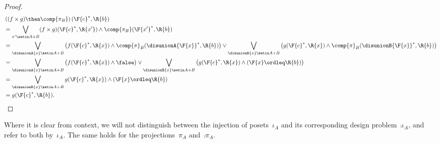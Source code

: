 \begin{proof}
\begin{equation}
\begin{aligned}
             & \left((f\times g)\then \comp{\pi_B}\right)(\F{c}^*,\R{b}) \\
             & =\bigvee_{x'\setin A+B} (f\times g)(\F{c}^*,\R{x'}) \wedge \comp{\pi_B}(\F{x'}^*,\R{b}) \\
             & =\bigvee_{\disunionA{x}\setin A+B}\left( f(\F{c}^*,\R{x}) \wedge \comp{\pi}_B(\disunionA{\F{x}}^*,\R{b})\right) \vee
            \bigvee_{\disunionB{x}\setin A+B}\left( g(\F{c}^*,\R{x}) \wedge \comp{\pi}_B(\disunionB{\F{x}}^*,\R{b})\right) \\
             & =\bigvee_{\disunionA{x}\setin A+B}\left( f(\F{c}^*,\R{x}) \wedge \false \right) \vee
            \bigvee_{\disunionB{x}\setin A+B}\left( g(\F{c}^*,\R{x}) \wedge (\F{x}\ordleq \R{b}) \right) \\
             & =\bigvee_{\disunionB{x}\setin A+B} g(\F{c}^*,\R{x}) \wedge (\F{x}\ordleq \R{b}) \\
             & =g(\F{c}^*,\R{b}).
        \end{aligned}
    \end{equation}
\end{proof}

\begin{remark}
    Where it is clear from context, we will not distinguish between the injection of posets~$\iota_A$ and its corresponding design problem~$\comp{\iota_A}$, and refer to both by~$\iota_A$.
    The same holds for the projections~$\pi_A$ and~$\comp{\pi_A}$.
\end{remark}


